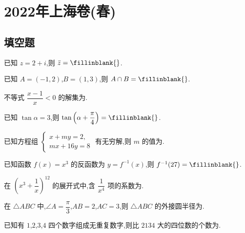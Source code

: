 

\chapter{2022年上海卷(春)}

\section{填空题}

\begin{problem}
已知 \(z=2+i\),则 \(\bar z=\fillinblank{}\).
\end{problem}

\begin{problem}
已知 \(A=(-1,2)\),\(B=(1,3)\),则 \(A\cap B=\fillinblank{}\).
\end{problem}

\begin{problem}
不等式 \(\dfrac{x-1}{x}<0\) 的解集为\fillinblank{}.
\end{problem}

\begin{problem}
已知 \(\tan\alpha=3\),则 \(\tan\left(\alpha+\dfrac\pi4\right)=\fillinblank{}\).
\end{problem}

\begin{problem}
已知方程组 \(\begin{cases}
x+my=2,\\
mx+16y=8
\end{cases}\) 有无穷解,则 \(m\) 的值为\fillinblank{}.
\end{problem}

\begin{problem}
已知函数 \(f(x)=x^3\) 的反函数为 \(y=f^{-1}(x)\),则 \(f^{-1}(27)=\fillinblank{}\).
\end{problem}

\begin{problem}
在 \(\left(x^3+\dfrac1x\right)^{12}\) 的展开式中,含 \(\dfrac1{x^4}\) 项的系数为\fillinblank{}.
\end{problem}

\begin{problem}
在 \(\triangle ABC\) 中,\(\angle A=\dfrac\pi3\),\(AB=2\),\(AC=3\),则 \(\triangle ABC\) 的外接圆半径为\fillinblank{}.
\end{problem}

\begin{problem}
已知有 \(1\),\(2\),\(3\),\(4\) 四个数字组成无重复数字,则比 \(2134\) 大的四位数的个数为\fillinblank{}.
\end{problem}

